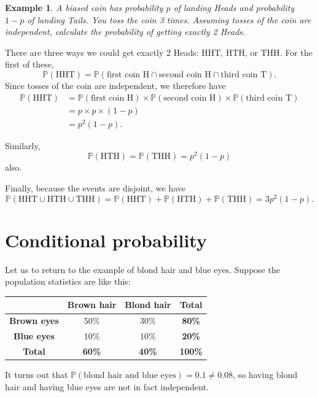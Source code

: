 \documentclass[
  a4paper,
]{book}
\theoremstyle{definition}
\theoremstyle{definition}
\newtheorem{example}{Example}[chapter]
\theoremstyle{definition}
\theoremstyle{definition}
\theoremstyle{remark}
\begin{document}
\begin{example}
\emph{A biased coin has probability \(p\) of landing Heads and probability \(1-p\) of landing Tails. You toss the coin 3 times. Assuming tosses of the coin are independent, calculate the probability of getting exactly 2 Heads.}

There are three ways we could get exactly 2 Heads: HHT, HTH, or THH. For the first of these,
\[ \mathbb P(\text{HHT}) = \mathbb P(\text{first coin H} \cap \text{second coin H} \cap \text{third coin T}) . \]
Since tosses of the coin are independent, we therefore have
\begin{align*}
\mathbb P(\text{HHT})
  &= \mathbb P(\text{first coin H}) \times \mathbb P ( \text{second coin H} )\times \mathbb P(\text{third coin T}) \\
  &=p \times p \times (1-p) \\
  &= p^2(1-p).
\end{align*}

Similarly,
\[ \mathbb P(\text{HTH}) = \mathbb P(\text{THH}) = p^2(1-p) \]
also.

Finally, because the events are disjoint, we have
\[ \mathbb P(\text{HHT} \cup\text{HTH} \cup \text{THH}) = \mathbb P(\text{HHT} ) + \mathbb P(\text{HTH}) + \mathbb P(\text{THH}) = 3p^2(1-p) . \]
\end{example}

\hypertarget{conditional}{%
\section{Conditional probability}\label{conditional}}

Let us to return to the example of blond hair and blue eyes. Suppose the population statistics are like this:

\begin{longtable}[]{@{}cccc@{}}
\toprule\noalign{}
& \textbf{Brown hair} & \textbf{Blond hair} & \textbf{Total} \\
\midrule\noalign{}
\endhead
\bottomrule\noalign{}
\endlastfoot
\textbf{Brown eyes} & 50\% & 30\% & \textbf{80\%} \\
\textbf{Blue eyes} & 10\% & 10\% & \textbf{20\%} \\
\textbf{Total} & \textbf{60\%} & \textbf{40\%} & \textbf{100\%} \\
\end{longtable}

It turns out that \(\mathbb P(\text{blond hair and blue eyes}) = 0.1 \neq 0.08\), so having blond hair and having blue eyes are not in fact independent.
\end{document}
